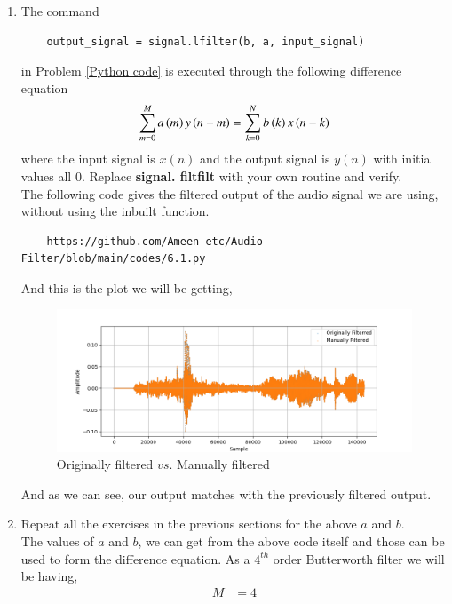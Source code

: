 \documentclass[journal,12pt,twocolumn]{IEEEtran}
\theoremstyle{remark}
\begin{document}
\begin{enumerate}[label=\thesection.\arabic*]
\vspace{1cm}
\item The command
\begin{lstlisting}
	output_signal = signal.lfilter(b, a, input_signal)
	\end{lstlisting}
in Problem \ref{Python code} is executed through the following difference equation
\begin{equation}
\label{eq:iir_filter_gen}
 \sum _{m=0}^{M}a\left(m\right)y\left(n-m\right)=\sum _{k=0}^{N}b\left(k\right)x\left(n-k\right) 
\end{equation}
%
where the input signal is $x(n)$ and the output signal is $y(n)$ with initial values all 0. Replace
\textbf{signal. filtfilt} with your own routine and verify.\\
\solution
The following code gives the filtered output of the audio signal we are using, without using the inbuilt function.
\begin{lstlisting}
    https://github.com/Ameen-etc/Audio-Filter/blob/main/codes/6.1.py
\end{lstlisting}
And this is the plot we will be getting,
\begin{figure}[h!]
    \centering
    \includegraphics[width=\columnwidth]{figs/manualvsfun.png}
    \caption{Originally filtered $vs.$ Manually filtered}
    \label{fig:enter-label}
\end{figure}
And as we can see, our output matches with the previously filtered output.
\vspace{1cm}
\item Repeat all the exercises in the previous sections for the above $a$ and $b$.\\
\solution The values of $a$ and $b$, we can get from the above code itself and those can be used to form the difference equation.
As a $4^{th}$ order Butterworth filter we will be having,
\begin{align}
    M&=4\\

\end{align}
\end{enumerate}
\end{document}
